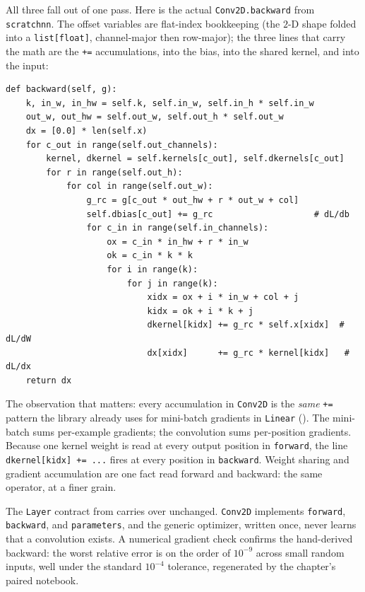 All three fall out of one pass. Here is the actual \texttt{Conv2D.backward}
from \texttt{scratchnn}. The offset variables are flat-index bookkeeping (the
$2$-D shape folded into a \texttt{list[float]}, channel-major then row-major);
the three lines that carry the math are the \texttt{+=} accumulations, into
the bias, into the shared kernel, and into the input:
\begin{lstlisting}
def backward(self, g):
    k, in_w, in_hw = self.k, self.in_w, self.in_h * self.in_w
    out_w, out_hw = self.out_w, self.out_h * self.out_w
    dx = [0.0] * len(self.x)
    for c_out in range(self.out_channels):
        kernel, dkernel = self.kernels[c_out], self.dkernels[c_out]
        for r in range(self.out_h):
            for col in range(self.out_w):
                g_rc = g[c_out * out_hw + r * out_w + col]
                self.dbias[c_out] += g_rc                    # dL/db
                for c_in in range(self.in_channels):
                    ox = c_in * in_hw + r * in_w
                    ok = c_in * k * k
                    for i in range(k):
                        for j in range(k):
                            xidx = ox + i * in_w + col + j
                            kidx = ok + i * k + j
                            dkernel[kidx] += g_rc * self.x[xidx]  # dL/dW
                            dx[xidx]      += g_rc * kernel[kidx]   # dL/dx
    return dx
\end{lstlisting}

The observation that matters: every accumulation in \texttt{Conv2D} is the
\emph{same} \texttt{+=} pattern the library already uses for mini-batch
gradients in \texttt{Linear} (). The mini-batch sums
per-example gradients; the convolution sums per-position gradients. Because
one kernel weight is read at every output position in \texttt{forward}, the
line \texttt{dkernel[kidx] += ...} fires at every position in
\texttt{backward}. Weight sharing and gradient accumulation are one fact read
forward and backward: the same operator, at a finer grain.

The \texttt{Layer} contract from  carries over
unchanged. \texttt{Conv2D} implements \texttt{forward}, \texttt{backward}, and
\texttt{parameters}, and the generic optimizer, written once, never learns
that a convolution exists. A numerical gradient check confirms the hand-derived
backward: the worst relative error is on the order of $10^{-9}$ across small
random inputs, well under the standard $10^{-4}$ tolerance, regenerated by the
chapter's paired notebook.
